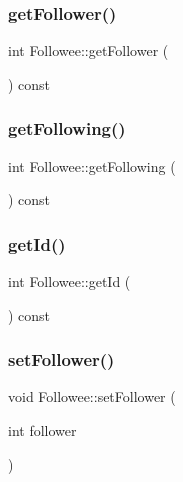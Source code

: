 \subsubsection{\texorpdfstring{get\+Follower()}{getFollower()}}
{\footnotesize\ttfamily int Followee\+::get\+Follower (\begin{DoxyParamCaption}{ }\end{DoxyParamCaption}) const}

\mbox{\label{class_followee_abb96db636d36246f2b3043d3dd9fa8ca}} 
\subsubsection{\texorpdfstring{get\+Following()}{getFollowing()}}
{\footnotesize\ttfamily int Followee\+::get\+Following (\begin{DoxyParamCaption}{ }\end{DoxyParamCaption}) const}

\mbox{\label{class_followee_a2609f8b97c1463c32bef82efb33f05fb}} 
\subsubsection{\texorpdfstring{get\+Id()}{getId()}}
{\footnotesize\ttfamily int Followee\+::get\+Id (\begin{DoxyParamCaption}{ }\end{DoxyParamCaption}) const}

\mbox{\label{class_followee_a3a4ce9c9c0bdd80815f32fd26578a538}} 
\subsubsection{\texorpdfstring{set\+Follower()}{setFollower()}}
{\footnotesize\ttfamily void Followee\+::set\+Follower (\begin{DoxyParamCaption}\item[{int}]{follower }\end{DoxyParamCaption})}

\mbox{\label{class_followee_a51c0c4c4452e7d4ed4ae4bb34687bcfe}} 

